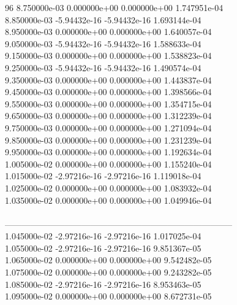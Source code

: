 96	8.750000e-03	0.000000e+00	0.000000e+00	1.747951e-04	\\ 	8.850000e-03	-5.94432e-16	-5.94432e-16	1.693144e-04	\\ 	8.950000e-03	0.000000e+00	0.000000e+00	1.640057e-04	\\ 	9.050000e-03	-5.94432e-16	-5.94432e-16	1.588633e-04	\\ 	9.150000e-03	0.000000e+00	0.000000e+00	1.538823e-04	\\ 	9.250000e-03	-5.94432e-16	-5.94432e-16	1.490574e-04	\\ 	9.350000e-03	0.000000e+00	0.000000e+00	1.443837e-04	\\ 	9.450000e-03	0.000000e+00	0.000000e+00	1.398566e-04	\\ 	9.550000e-03	0.000000e+00	0.000000e+00	1.354715e-04	\\ 	9.650000e-03	0.000000e+00	0.000000e+00	1.312239e-04	\\ 	9.750000e-03	0.000000e+00	0.000000e+00	1.271094e-04	\\ 	9.850000e-03	0.000000e+00	0.000000e+00	1.231239e-04	\\ 	9.950000e-03	0.000000e+00	0.000000e+00	1.192634e-04	\\ 	1.005000e-02	0.000000e+00	0.000000e+00	1.155240e-04	\\ 	1.015000e-02	-2.97216e-16	-2.97216e-16	1.119018e-04	\\ 	1.025000e-02	0.000000e+00	0.000000e+00	1.083932e-04	\\ 	1.035000e-02	0.000000e+00	0.000000e+00	1.049946e-04	\\ \hline
\\ \hline
--------------------------------------------------------------------------------\\ 	1.045000e-02	-2.97216e-16	-2.97216e-16	1.017025e-04	\\ 	1.055000e-02	-2.97216e-16	-2.97216e-16	9.851367e-05	\\ 	1.065000e-02	0.000000e+00	0.000000e+00	9.542482e-05	\\ 	1.075000e-02	0.000000e+00	0.000000e+00	9.243282e-05	\\ 	1.085000e-02	-2.97216e-16	-2.97216e-16	8.953463e-05	\\ 	1.095000e-02	0.000000e+00	0.000000e+00	8.672731e-05	\\ \hline
